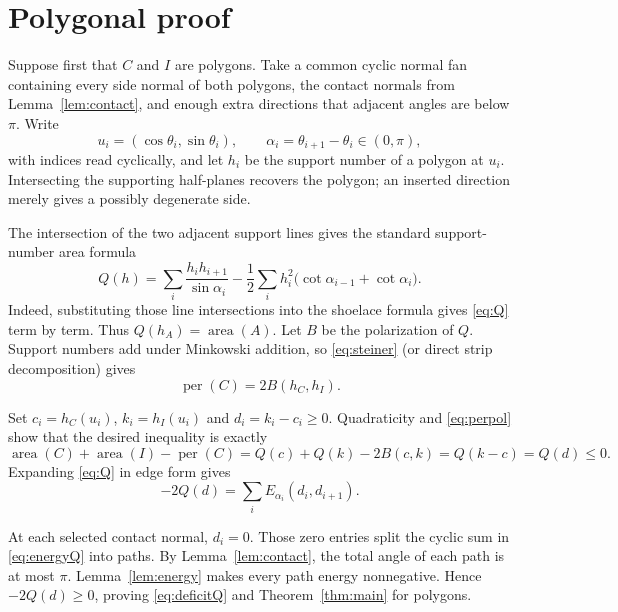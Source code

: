 \documentclass[11pt]{article}
\newcommand{\area}{\operatorname{area}}
\newcommand{\perim}{\operatorname{per}}
\begin{document}
\section{Polygonal proof}

Suppose first that $C$ and $I$ are polygons.  Take a common cyclic normal
fan containing every side normal of both polygons, the contact normals from
Lemma~\ref{lem:contact}, and enough extra directions that adjacent angles
are below $\pi$.  Write
\[
 u_i=(\cos\theta_i,\sin\theta_i),\qquad
 \alpha_i=\theta_{i+1}-\theta_i\in(0,\pi),
\]
with indices read cyclically, and let $h_i$ be the support number of a
polygon at $u_i$.  Intersecting the supporting half-planes recovers the
polygon; an inserted direction merely gives a possibly degenerate side.

The intersection of the two adjacent support lines gives the standard
support-number area formula
\begin{equation}\label{eq:Q}
 Q(h)=
 \sum_i\frac{h_i h_{i+1}}{\sin\alpha_i}
 -\frac12\sum_i h_i^2
 \bigl(\cot\alpha_{i-1}+\cot\alpha_i\bigr).
\end{equation}
Indeed, substituting those line intersections into the shoelace formula
gives \eqref{eq:Q} term by term.  Thus $Q(h_A)=\area(A)$.  Let $B$ be the
polarization of $Q$.  Support numbers add under Minkowski addition, so
\eqref{eq:steiner} (or direct strip decomposition) gives
\begin{equation}\label{eq:perpol}
 \perim(C)=2B(h_C,h_I).
\end{equation}

Set $c_i=h_C(u_i)$, $k_i=h_I(u_i)$ and $d_i=k_i-c_i\geq0$.  Quadraticity and
\eqref{eq:perpol} show that the desired inequality is exactly
\begin{equation}\label{eq:deficitQ}
 \area(C)+\area(I)-\perim(C)
 =Q(c)+Q(k)-2B(c,k)=Q(k-c)=Q(d)\leq0.
\end{equation}
Expanding \eqref{eq:Q} in edge form gives
\begin{equation}\label{eq:energyQ}
 -2Q(d)=\sum_i E_{\alpha_i}(d_i,d_{i+1}).
\end{equation}

At each selected contact normal, $d_i=0$.  Those zero entries split the
cyclic sum in \eqref{eq:energyQ} into paths.  By
Lemma~\ref{lem:contact}, the total angle of each path is at most $\pi$.
Lemma~\ref{lem:energy} makes every path energy nonnegative.  Hence
$-2Q(d)\geq0$, proving \eqref{eq:deficitQ} and Theorem~\ref{thm:main} for
polygons.
\end{document}

